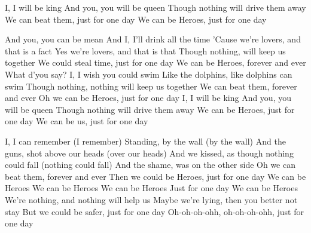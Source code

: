 \begin{guitar}
I, I will be king
And you, you will be queen
Though nothing will drive them away
We can beat them, just for one day
We can be Heroes, just for one day

And you, you can be mean
And I, I'll drink all the time
'Cause we're lovers, and that is a fact
Yes we're lovers, and that is that
Though nothing, will keep us together
We could steal time, just for one day
We can be Heroes, forever and ever
What d'you say?
I, I wish you could swim
Like the dolphins, like dolphins can swim
Though nothing, nothing will keep us together
We can beat them, forever and ever
Oh we can be Heroes, just for one day
I, I will be king
And you, you will be queen
Though nothing will drive them away
We can be Heroes, just for one day
We can be us, just for one day

I, I can remember (I remember)
Standing, by the wall (by the wall)
And the guns, shot above our heads (over our heads)
And we kissed, as though nothing could fall (nothing could fall)
And the shame, was on the other side
Oh we can beat them, forever and ever
Then we could be Heroes, just for one day
We can be Heroes
We can be Heroes
We can be Heroes
Just for one day
We can be Heroes
We're nothing, and nothing will help us
Maybe we're lying, then you better not stay
But we could be safer, just for one day
Oh-oh-oh-ohh, oh-oh-oh-ohh, just for one day 
\end{guitar}